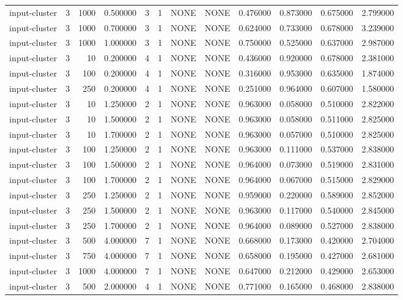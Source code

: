 \begin{tabular}{lrrrllllrrrr}
input-cluster & 3 & 1000 & 0.500000 & 3 & 1 & NONE & NONE & 0.476000 & 0.873000 & 0.675000 & 2.799000 \\
input-cluster & 3 & 1000 & 0.700000 & 3 & 1 & NONE & NONE & 0.624000 & 0.733000 & 0.678000 & 3.239000 \\
input-cluster & 3 & 1000 & 1.000000 & 3 & 1 & NONE & NONE & 0.750000 & 0.525000 & 0.637000 & 2.987000 \\
input-cluster & 3 & 10 & 0.200000 & 4 & 1 & NONE & NONE & 0.436000 & 0.920000 & 0.678000 & 2.381000 \\
input-cluster & 3 & 100 & 0.200000 & 4 & 1 & NONE & NONE & 0.316000 & 0.953000 & 0.635000 & 1.874000 \\
input-cluster & 3 & 250 & 0.200000 & 4 & 1 & NONE & NONE & 0.251000 & 0.964000 & 0.607000 & 1.580000 \\
input-cluster & 3 & 10 & 1.250000 & 2 & 1 & NONE & NONE & 0.963000 & 0.058000 & 0.510000 & 2.822000 \\
input-cluster & 3 & 10 & 1.500000 & 2 & 1 & NONE & NONE & 0.963000 & 0.058000 & 0.511000 & 2.825000 \\
input-cluster & 3 & 10 & 1.700000 & 2 & 1 & NONE & NONE & 0.963000 & 0.057000 & 0.510000 & 2.825000 \\
input-cluster & 3 & 100 & 1.250000 & 2 & 1 & NONE & NONE & 0.963000 & 0.111000 & 0.537000 & 2.838000 \\
input-cluster & 3 & 100 & 1.500000 & 2 & 1 & NONE & NONE & 0.964000 & 0.073000 & 0.519000 & 2.831000 \\
input-cluster & 3 & 100 & 1.700000 & 2 & 1 & NONE & NONE & 0.964000 & 0.067000 & 0.515000 & 2.829000 \\
input-cluster & 3 & 250 & 1.250000 & 2 & 1 & NONE & NONE & 0.959000 & 0.220000 & 0.589000 & 2.852000 \\
input-cluster & 3 & 250 & 1.500000 & 2 & 1 & NONE & NONE & 0.963000 & 0.117000 & 0.540000 & 2.845000 \\
input-cluster & 3 & 250 & 1.700000 & 2 & 1 & NONE & NONE & 0.964000 & 0.089000 & 0.527000 & 2.838000 \\
input-cluster & 3 & 500 & 4.000000 & 7 & 1 & NONE & NONE & 0.668000 & 0.173000 & 0.420000 & 2.704000 \\
input-cluster & 3 & 750 & 4.000000 & 7 & 1 & NONE & NONE & 0.658000 & 0.195000 & 0.427000 & 2.681000 \\
input-cluster & 3 & 1000 & 4.000000 & 7 & 1 & NONE & NONE & 0.647000 & 0.212000 & 0.429000 & 2.653000 \\
input-cluster & 3 & 500 & 2.000000 & 4 & 1 & NONE & NONE & 0.771000 & 0.165000 & 0.468000 & 2.838000 \\

\end{tabular}
